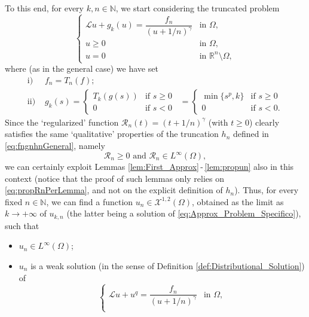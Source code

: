 \documentclass[11pt,a4paper]{amsart}
\theoremstyle{definition}
\theoremstyle{plain}
\numberwithin{equation}{section}
\begin{document}
{To this end, for every $k,n\in\mathbb{N}$, we start considering the truncated problem
\begin{equation}\label{eq:Approx_Problem_Specifico}
	\begin{cases}
		\mathcal{L}u + g_{k}(u) = \dfrac{f_n}{(u+1/n)^\gamma} & \textrm{in } \Omega,\\
		u \geq 0 & \textrm{in } \Omega,\\
		u = 0 & \textrm{in } \mathbb{R}^{n}\setminus \Omega,
	\end{cases}
\end{equation}  
where (as in the general case) we have set
\begin{align*}
	\mathrm{i)}\,\,&f_n= T_{n}(f); \\
	\mathrm{ii)}\,\,&
	g_{k}(s)= \begin{cases}
		T_{k}(g(s)) & \text{if $s\geq 0$}\\
		0 & \text{if $s < 0$}
	\end{cases} 
	\,\,\,= \begin{cases}
		\min\{s^p,k\} & \text{if $s\geq 0$} \\
		0 & \text{if $s < 0$}.
	\end{cases}
\end{align*}
Since the `regularized' function $\mathcal{R}_n(t) = (t+1/n)^\gamma$ (with $t\geq 0$)
clearly satisfies the same `qua\-li\-tative' pr\-o\-per\-ties of the truncation $h_n$ defined in 
\eqref{eq:fngnhnGeneral}, namely
\begin{equation}\label{eq:propRnPerLemma}
	\text{$\mathcal{R}_n\geq 0$ and $\mathcal{R}_n\in L^\infty(\Omega)$},
\end{equation}
we can certainly exploit Lemmas \ref{lem:First_Approx}\,-\,\ref{lem:propun} 
also in this context (notice that the proof of such lemmas only relies on
\eqref{eq:propRnPerLemma},
and not on the explicit definition of $h_n$). Thus, for every fixed $n\in\mathbb{N}$,
we can
find a function $u_n\in\mathcal{X}^{1,2}(\Omega)$, obtained
as the limit as $k\to+\infty$ of $u_{k,n}$ (the latter being a solution
of
\eqref{eq:Approx_Problem_Specifico}),
such that
\begin{itemize}
	\item[(P1)] $u_n\in L^\infty(\Omega)$;
	\item[(P2)] $u_n$ is a weak solution (in the sense of Definition \ref{def:Distributional_Solution}) of
	\begin{equation*}
		\begin{cases}
			\mathcal{L}u+ u^q  = \dfrac{f_n}{(u+1/n)^\gamma} & \textrm{in } \Omega,\\

\end{cases}
\end{equation*}
\end{itemize}}
\end{document}
